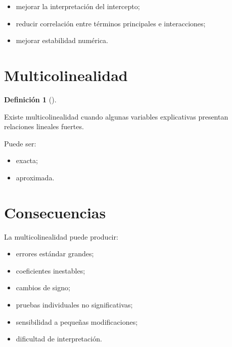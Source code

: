 \documentclass[
  spanish,
  10.5pt,
  letterpaper,
  DIV=11,
  numbers=noendperiod,
  oneside,
  open=any]{scrreprt}
\providecommand{\tightlist}{%
  \setlength{\itemsep}{0pt}\setlength{\parskip}{0pt}}
\theoremstyle{definition}
\newtheorem{definition}{Definición}[chapter]
\theoremstyle{definition}
\theoremstyle{plain}
\theoremstyle{remark}
\begin{document}
\begin{itemize}
\tightlist
\item
  mejorar la interpretación del intercepto;
\item
  reducir correlación entre términos principales e interacciones;
\item
  mejorar estabilidad numérica.
\end{itemize}

\section*{Multicolinealidad}\label{multicolinealidad}


\begin{definition}[]\protect\hypertarget{def-multicolinealidad}{}\label{def-multicolinealidad}

Existe multicolinealidad cuando algunas variables explicativas presentan
relaciones lineales fuertes.

\end{definition}

Puede ser:

\begin{itemize}
\tightlist
\item
  exacta;
\item
  aproximada.
\end{itemize}

\section*{Consecuencias}\label{consecuencias}


La multicolinealidad puede producir:

\begin{itemize}
\tightlist
\item
  errores estándar grandes;
\item
  coeficientes inestables;
\item
  cambios de signo;
\item
  pruebas individuales no significativas;
\item
  sensibilidad a pequeñas modificaciones;
\item
  dificultad de interpretación.
\end{itemize}
\end{document}
